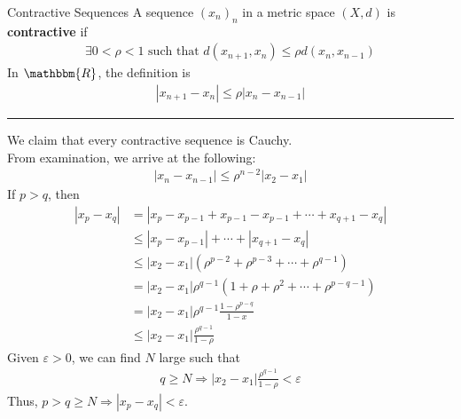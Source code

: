 \documentclass[10pt]{extarticle}
\newcommand{\R}{\mathbbm{R}}
\begin{document}
  \begin{problem}{Contractive Sequences}
    A sequence $(x_n)_n$ in a metric space $(X,d)$ is \textbf{contractive} if
    \begin{align*}
      \exists 0 < \rho < 1 \text{ such that } d(x_{n+1},x_n) \leq \rho d(x_{n},x_{n-1}) \tag*{$\forall n\geq 1$}
    \end{align*}
    In $\R$, the definition is
    \begin{align*}
      |x_{n+1}-x_n| \leq \rho |x_n - x_{n-1}|
    \end{align*}
    \vspace{4pt}
    \rule{\textwidth}{0.4pt}
    \vspace{4pt}
    We claim that every contractive sequence is Cauchy.\\

    From examination, we arrive at the following:
    \begin{align*}
      |x_{n} - x_{n-1}| \leq \rho^{n-2}|x_{2}-x_{1}| \tag*{($\ast$)}
    \end{align*}
    If $p > q$, then
    \begin{align*}
      |x_{p}-x_{q}| &= |x_{p}-x_{p-1} + x_{p-1}-x_{p-1} + \cdots + x_{q+1}-x_q|\\
                    &\leq |x_p-x_{p-1}| + \cdots + |x_{q+1}-x_q|\tag*{Triangle Inequality}\\
                    &\leq |x_2-x_1| \left(\rho^{p-2} + \rho^{p-3} + \cdots + \rho^{q-1}\right)\\
                    &= |x_2-x_1| \rho^{q-1} \left(1 + \rho + \rho^2 + \cdots + \rho^{p-q-1}\right)\\
                    &= |x_2-x_1|\rho^{q-1}\frac{1-\rho^{p-q}}{1-x}\tag*{Finite Geometric Sequence}\\
                    &\leq |x_2 - x_1| \frac{\rho^{q-1}}{1-\rho}
    \end{align*}
    Given $\varepsilon > 0$, we can find $N$ large such that 
    \begin{align*}
      q\geq N \Rightarrow |x_2-x_1| \frac{\rho^{q-1}}{1-\rho} < \varepsilon
    \end{align*}
    Thus, $p > q \geq N \Rightarrow |x_p-x_q| < \varepsilon$.
  \end{problem}
\end{document}
